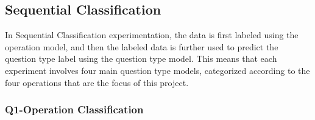 \documentclass[12pt,oneside,openright,a4paper]{cpe-english-project}
\begin{document}
    \subsection{Sequential Classification}
      \qquad In Sequential Classification experimentation, the data is first labeled using the operation model, and then the labeled data is further used to predict the question type label using the question type model. This means that each experiment involves four main question type models, categorized according to the four operations that are the focus of this project. \par
      \subsubsection{Q1-Operation Classification}
        \begin{table}
          \scriptsize
          \centering
          \caption{Q1-Operation Classification (\textthai{ถอนฟัน}) Result}
\end{table}
\end{document}
